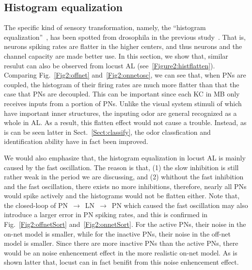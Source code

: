 \documentclass[12pt, a4paper]{article}
\begin{document}


\subsection{Histogram equalization} \label{Sect:histeq}
The specific kind of sensory transformation, namely, the ``histogram equalization''~\citep{}, has been spotted from drosophila in the previous study~\citep{}. That is, neurons spiking rates are flatter in the higher centers, and thus neurons and the channel capacity are made better use. In this section, we show that, similar resulut can also be observed from locust AL (see~\ref{Figure2:histflatten}). Comparing Fig.~\ref{Fig2:offnet} and~\ref{Fig2:onnetosc}, we can see that, when PNs are coupled, the histogram of their firing rates are much more flatter than that the case that PNs are decoupled. This can be important since each KC in MB only receives inputs from a portion of PNs. Unlike the visual system stimuli of which have important inner structures, the inputing odor are general recognized as a whole in AL. As a result, this flatten effect would not cause a trouble. Instead, as is can be seen latter in Sect.~\ref{Sect:classify}, the odor classfication and identification ability have in fact been improved.

We would also emphasize that, the histogram equalization in locust AL is mainly caused by the fast oscillation. The reason is that, (1) the slow inhibition is still rather weak in the period we are discussing, and (2) whithout the fast inhibition and the fast oscillation, there exists no more inhibitions, therefore, nearly all PNs would spike actively and the histograms would not be flatten either. Note that, the closed-loop of {PN~$\rightarrow$~LN~$\rightarrow$~PN} which caused the fast oscillation may also introduce a larger error in PN spiking rates, and this is confirmed in Fig.~\ref{Fig2:offnetSort} and~\ref{Fig2:onnetSort}. For the active PNs, their noise in the on-net model is smaller, while for the inactive PNs, their noise in the off-net model is smaller. Since there are more inactive PNs than the active PNs, there would be an noise enhencement effect in the more realistic on-net model. As is shown latter that, locust can in fact benifit from this noise enhencement effect.
\end{document}
